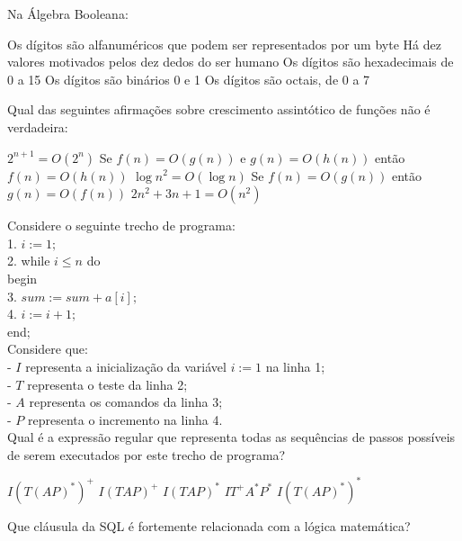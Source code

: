 \documentclass[12pt, addpoints]{exam}
\begin{document}
    \begin{questions}

    \newpage
    \question
Na Álgebra Booleana:
\begin{choices}
\choice Os dígitos são alfanuméricos que podem ser representados por um byte
\choice Há dez valores motivados pelos dez dedos do ser humano
\choice Os dígitos são hexadecimais de 0 a 15
\choice Os dígitos são binários 0 e 1
\choice Os dígitos são octais, de 0 a 7
\end{choices}

\question
Qual das seguintes afirmações sobre crescimento assintótico de funções não é verdadeira:
\begin{choices}
\choice \( 2^{n+1} = O(2^n) \)
\choice Se \( f(n) = O(g(n)) \) e \( g(n) = O(h(n)) \) então \( f(n) = O(h(n)) \)
\choice \( \log n^2 = O(\log n) \)
\choice Se \( f(n) = O(g(n)) \) então \( g(n) = O(f(n)) \)
\choice \( 2n^2 + 3n + 1 = O(n^2) \)
\end{choices}

\question
Considere o seguinte trecho de programa:\\
1. \( i := 1; \)\\
2. while \( i \leq n \) do\\
   begin\\
3. \( sum := sum + a[i]; \)\\
4. \( i := i + 1; \)\\
   end;\\

Considere que:\\
- \( I \) representa a inicialização da variável \( i := 1 \) na linha 1;\\
- \( T \) representa o teste da linha 2;\\
- \( A \) representa os comandos da linha 3;\\
- \( P \) representa o incremento na linha 4.\\

Qual é a expressão regular que representa todas as sequências de passos possíveis de serem executados por este trecho de programa?
\begin{choices}
\choice \( I(T(AP)^*)^+ \)
\choice \( I(TAP)^+ \)
\choice \( I(TAP)^* \)
\choice \( IT^+A^*P^* \)
\choice \( I(T(AP)^*)^* \)
\end{choices}

\question
Que cláusula da SQL é fortemente relacionada com a lógica matemática?


\end{questions}
\end{document}
